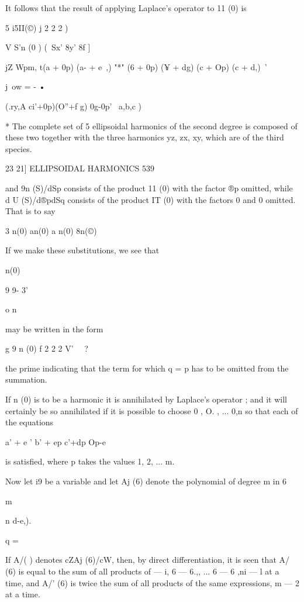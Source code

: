 It follows that the result of applying Laplace's operator to 11 (0) is

5 i5II(©) j 2 2 2 )

V S'n (0 ) (\ Sx' 8y' 8f ]

  jZ Wpm, t(a + 0p) (a- + e~,) "*" (6 + 0p) (¥ + dg) (c + Op) (c +
d,)\ '

j\ ow = - •

(.ry,A ci'+0p)(O''+f g) 0g-0p' \ a,b,c )

* The complete set of 5 ellipsoidal harmonics of the second degree is
composed of these two together with the three harmonics yz, zx, xy,
which are of the third species.



23 21] ELLIPSOIDAL HARMONICS 539

and 9n (S)/dSp consists of the product 11 (0) with the factor ®p
omitted, while d U (S)/d®pdSq consists of the product IT (0) with the
factors 0 and 0 omitted. That is to say

3 n(0) an(0) a n(0) 8n(©)



If we make these substitutions, we see that

n(0)



9 9- 3'



 o n



may be written in the form

g 9 n (0) f 2 2 2 V' \ \ ?\

the prime indicating that the term for which q = p has to be omitted
from the summation.

If n (0) is to be a harmonic it is annihilated by Laplace's operator ;
and it will certainly be so annihilated if it is possible to choose 0
, O. , ... 0,n so that each of the equations

a' + e ' b' + ep c'+dp Op-e

is satisfied, where p takes the values 1, 2, ... m.

Now let i9 be a variable and let Aj (6) denote the polynomial of
degree m in 6

m

n d-e,).

q = \

If A/( ) denotes cZAj (6)/cW, then, by direct differentiation, it is
seen that A/ (6) is equal to the sum of all products of — i, 6 — 6.,,
... 6 — 6 ,ni — l at a time, and A/' (6) is twice the sum of all
products of the same expressions, m — 2 at a time.

